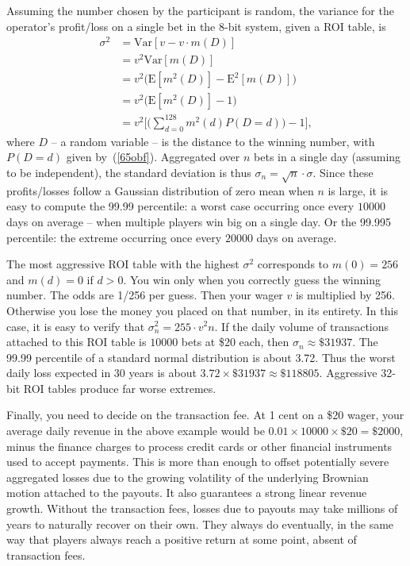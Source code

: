 \documentclass[oneside,10pt]{book}
\begin{document}
Assuming the number chosen by the participant is random, the variance for the operator's profit/loss on a
 single bet in the 8-bit system, given a ROI table, is
\begin{align}
\sigma^2 & =  \text{Var}[v  - v \cdot m(D)] \nonumber \\
 & = v^2 \text{Var}[m(D)]\\
  & = v^2 \Big(\text{E}[m^2(D)] - \text{E}^2[m(D)]\Big) \nonumber \\
  & = v^2 \Big(\text{E}[m^2(D)] - 1\Big)  \nonumber \\
  & = v^2 \Bigg[\Big(\sum_{d=0}^{128} m^2(d) P(D=d)\Big) -1\Bigg], \label{p120jh}
\end{align}
where  $D$  -- a random variable -- is the distance to the winning number,
 with $P(D=d)$ given by~(\ref{65obf}). Aggregated over $n$ bets in a single day (assuming to be independent),
 the standard deviation is thus $\sigma_n = \sqrt{n}\cdot\sigma$. Since these profits/losses follow a Gaussian distribution of zero mean when $n$ is large,
 it is easy to compute the 99.99 percentile: a worst case occurring once every $\num{10000}$ days on average -- when multiple players win big on a single day. Or the 99.995 percentile: the extreme occurring once every $\num{20000}$ days on average.

The most aggressive ROI table with the highest $\sigma^2$ corresponds to $m(0)=256$ and $m(d)=0$ if $d>0$.
 You win only when you correctly guess the winning number. The odds are 1/256 per guess. Then your wager $v$ is multiplied
 by 256. Otherwise you lose the money you placed on that number, in its entirety.  In this case, it is easy to verify that
$\sigma^2_n= 255 \cdot v^2 n$.
If the daily volume of transactions attached to this ROI table
 is $\num{10000}$ bets at \$20 each, then $\sigma_n \approx \$\num{31937}$. The 99.99 percentile of a standard normal distribution is about 3.72. Thus the worst daily loss expected in 30 years is about $3.72 \times \$\num{31937} \approx \$\num{118805}$. Aggressive 32-bit ROI tables produce far worse extremes.

Finally, you need to decide on the transaction fee. At 1 cent on a \$20 wager, your average daily revenue
 in the above example would be $0.01 \times \num{10000}\times \$20 = \$2000$, minus the finance charges to process credit cards or other financial instruments used to accept payments. This is more than enough to offset potentially severe aggregated losses due to the growing volatility of the underlying Brownian motion attached to the payouts. It also
 guarantees a strong linear revenue growth. Without the transaction fees, losses due to payouts may take millions of years to naturally recover on their own. They always do eventually, in the same way that players always reach a positive return at some point, absent of transaction fees.
\end{document}
